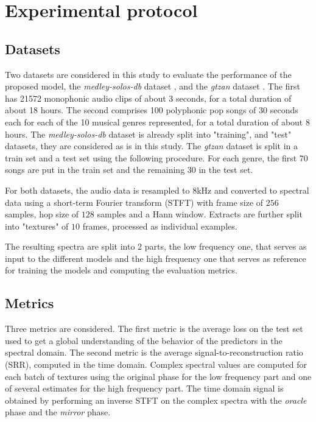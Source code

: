 \documentclass{article}
\begin{document}
\section{Experimental protocol}
\label{sec:protocol}

\subsection{Datasets}

Two datasets are considered in this study to evaluate the performance of the proposed model, the \textit{medley-solos-db} dataset \cite{lostanlen2016deep}, and the \textit{gtzan} dataset \cite{tzanetakis2002musical}. The first has 21572 monophonic audio clips of about 3 seconds, for a total duration of about 18 hours. The second comprises 100 polyphonic pop songs of 30 seconds each for each of the 10 musical genres represented, for a total duration of about 8 hours. The \textit{medley-solos-db} dataset is already split into "training", and "test" datasets, they are considered as is in this study. The \textit{gtzan} dataset is split in a train set and a test set using the following procedure. For each genre, the first 70 songs are put in the train set and the remaining 30 in the test set.

For both datasets, the audio data is resampled to $8$kHz and converted to spectral data using a short-term Fourier transform (STFT) with frame size of $256$ samples, hop size of $128$ samples and a Hann window. Extracts are further split into "textures" of $10$ frames, processed as individual examples.

The resulting spectra are split into 2 parts, the low frequency one, that serves as input to the different models and the high frequency one that serves as reference for training the models and computing the evaluation metrics.

\subsection{Metrics}


Three metrics are considered. The first metric is the average loss on the test set used to get a global understanding of the behavior of the predictors in the spectral domain. The second metric is the average signal-to-reconstruction ratio (SRR), computed in the time domain. Complex spectral values are computed for each batch of textures using the original phase for the low frequency part and one of several estimates for the high frequency part. The time domain signal is obtained by performing an inverse STFT on the complex spectra with the \textit{oracle} phase and the \textit{mirror} phase.
\end{document}
